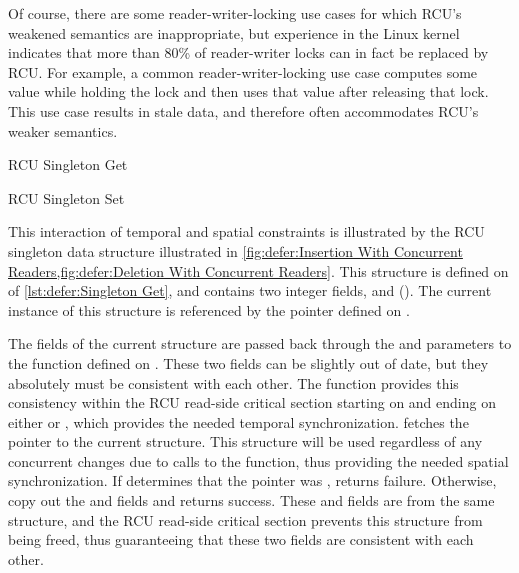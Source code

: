 Of course, there are some reader-writer-locking use cases for which
RCU's weakened semantics are inappropriate, but experience in the Linux
kernel indicates that more than 80\% of reader-writer locks can in fact
be replaced by RCU\@.
For example, a common reader-writer-locking use case computes some value
while holding the lock and then uses that value after releasing that lock.
This use case results in stale data, and therefore often accommodates
RCU's weaker semantics.

\begin{listing}

\caption{RCU Singleton Get}
\label{lst:defer:Singleton Get}
\end{listing}

\begin{listing}

\caption{RCU Singleton Set}
\label{lst:defer:Singleton Set}
\end{listing}

\begin{fcvref}
This interaction of temporal and spatial constraints is illustrated
by the RCU singleton data structure illustrated in
\cref{fig:defer:Insertion With Concurrent Readers,fig:defer:Deletion With Concurrent Readers}.
This structure is defined on  of
\cref{lst:defer:Singleton Get}, and contains two integer fields,
 and  ().
The current instance of this structure is referenced by the 
pointer defined on .
\end{fcvref}

\begin{fcvref}
The fields of the current structure are passed back through the
 and  parameters to the  function
defined on .
These two fields can be slightly out of date, but they absolutely must
be consistent with each other.
The  function provides this consistency
within the RCU read-side critical section starting on
 and ending on either  or ,
which provides the needed temporal synchronization.
 fetches the pointer to the current  structure.
This structure will be used regardless of any concurrent changes due
to calls to the  function, thus providing the needed
spatial synchronization.
If  determines that the  pointer was
,  returns failure.
Otherwise,  copy out the  and  fields
and  returns success.
These  and  fields are from the same 
structure, and the RCU read-side critical section prevents this structure
from being freed, thus guaranteeing that these two fields are consistent
with each other.
\end{fcvref}

